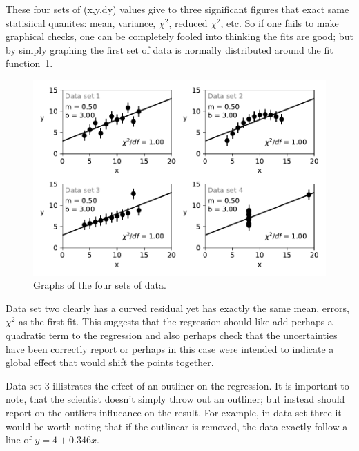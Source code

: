 \documentclass[10pt,aps,prc,twocolumn]{revtex4-1}
\begin{document}
\begin{appendix}
These four sets of (x,y,dy) values give to three significant figures that exact
same statisiical quanites: mean, variance, $\chi^2$, reduced $\chi^2$, etc.
So if one fails to make graphical checks, one can be completely fooled into thinking
the fits are good; but by simply graphing the first set of data is normally distributed
around the fit function~\ref{SameChi2}.   

\begin{figure}[htb]
\includegraphics[width=\columnwidth]{Figure/SameChi2.pdf}
\caption{Graphs of the four sets of data.}
\label{SameChi2}
\end{figure}


Data set two clearly has a curved residual yet has exactly the 
same mean, errors, $\chi^2$ as the first fit.   This suggests that the regression should
like add perhaps a quadratic term to the regression and also perhaps check that
the uncertainties have been correctly report or perhaps in this case were intended
to indicate a global effect that would shift the points together.

Data set 3 illistrates the effect of an outliner on the regression.
It is important to note, that the scientist doesn't simply throw out an outliner;
but instead should report on the outliers influcance on the result.   For example,
in data set three it would be worth noting that if the outlinear is removed, the data
exactly follow a line of $y = 4 + 0.346 x$.


\end{appendix}
\end{document}

